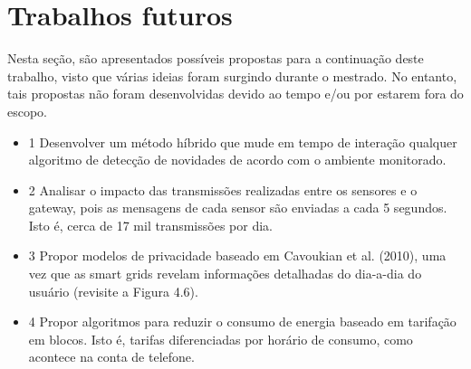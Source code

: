 \section{Trabalhos futuros}
Nesta se\c{c}\~{a}o, s\~{a}o apresentados poss\'{i}veis propostas para a continua\c{c}\~{a}o deste trabalho, visto que v\'{a}rias ideias foram surgindo durante o mestrado. No entanto, tais propostas n\~{a}o foram desenvolvidas devido ao tempo e/ou por estarem fora do escopo.

\begin{itemize}
	\item{1} Desenvolver um m\'{e}todo h\'{i}brido que mude em tempo de intera\c{c}\~{a}o qualquer algoritmo de detec\c{c}\~{a}o de novidades de acordo com o ambiente monitorado.
	\item{2} Analisar o impacto das transmiss\~{o}es realizadas entre os sensores e o gateway, pois as mensagens de cada sensor s\~{a}o enviadas a cada 5 segundos. Isto \'{e}, cerca de 17 mil transmiss\~{o}es por dia.
	\item{3} Propor modelos de privacidade baseado em Cavoukian et al. (2010), uma vez que as smart grids revelam informa\c{c}\~{o}es detalhadas do dia-a-dia do usu\'{a}rio (revisite a Figura 4.6).
	\item{4} Propor algoritmos para reduzir o consumo de energia baseado em tarifa\c{c}\~{a}o em blocos. Isto \'{e}, tarifas diferenciadas por hor\'{a}rio de consumo, como acontece na conta de telefone.
\end{itemize}


